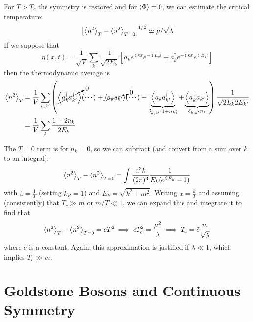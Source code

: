 \documentclass[a4paper,twoside,master.tex]{subfiles}
\begin{document}

For $ T > T_c $ the symmetry is restored and for $ \ev{\Phi} = 0 $, we can estimate the critical temperature:
\begin{equation}
    \left[ \ev{n^2}_T - \ev{n^2}_{T=0} \right]^{1/2} \simeq \mu / \sqrt{\lambda}
\end{equation}
If we suppose that
\begin{equation}
    \eta(x,t) = \frac{1}{\sqrt{V}} \sum_k \frac{1}{\sqrt{2 E_k}} \left[ a_k e^{\imath kx} e^{- \imath E_k t} + a^\dagger_k e^{- \imath k x} e^{\imath E_k t} \right]
\end{equation}
then the thermodynamic average is
\begin{align}
    \ev{n^2}_T &= \frac{1}{V} \sum_{k, k'}\left( \cancelto{0}{\ev{a^\dagger_k a^\dagger_{k'}}}(\cdots) + \cancelto{0}{\ev{a_k a_{k'}}}(\cdots) + \underbrace{\ev{a_k a^\dagger_{k'}}}_{\delta_{k,k'} (1 + n_k)} + \underbrace{\ev{a^\dagger_k a_{k'}}}_{\delta_{k,k'} n_k} \right) \frac{1}{\sqrt{2 E_k 2 E_{k'}}} \\
               &= \frac{1}{V} \sum_k \frac{1 + 2 n_k}{2 E_k}
\end{align}

The $ T=0 $ term is for $ n_k = 0 $, so we can subtract (and convert from a sum over $ k $ to an integral):
\begin{equation}
    \ev{n^2}_T - \ev{n^2}_{T=0} = \int \frac{\dd[3]{k}}{(2 \pi)^3} \frac{1}{E_k (e^{\beta E_k} - 1)}
\end{equation}
with $ \beta = \frac{1}{T} $ (setting $ k_B = 1 $) and $ E_k = \sqrt{k^2 + m^2} $. Writing $ x = \frac{k}{T} $ and assuming (consistently) that $ T_c \gg m $ or $ m/T \ll 1 $, we can expand this and integrate it to find that
\begin{equation}
    \ev{n^2}_T - \ev{n^2}_{T=0} = c T^2 \implies c T_c^2 = \frac{\mu^2}{\lambda} \implies T_c = \tilde{c} \frac{m}{\sqrt{\lambda}}
\end{equation}
where $ c $ is a constant. Again, this approximation is justified if $ \lambda \ll 1 $, which implies $ T_c \gg m $.

\section{Goldstone Bosons and Continuous Symmetry}\label{sec:goldstone_bosons_and_continuous_symmetry}
\end{document}
